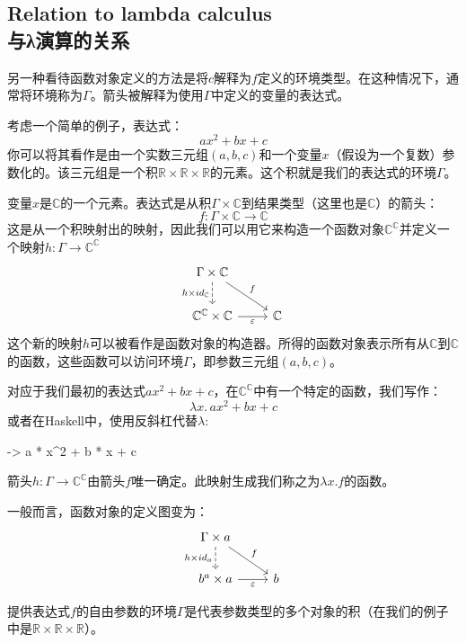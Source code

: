 \documentclass[DaoFP]{subfiles}
\begin{document}
\subsection{Relation to lambda calculus\\与λ演算的关系}

另一种看待函数对象定义的方法是将$c$解释为$f$定义的环境类型。在这种情况下，通常将环境称为$\Gamma$。箭头被解释为使用$\Gamma$中定义的变量的表达式。

考虑一个简单的例子，表达式：
\[a x^2 + b x + c\]
你可以将其看作是由一个实数三元组$(a, b, c)$和一个变量$x$（假设为一个复数）参数化的。该三元组是一个积$\mathbb{R} \times \mathbb{R} \times \mathbb{R}$的元素。这个积就是我们的表达式的环境$\Gamma$。

变量$x$是$\mathbb{C}$的一个元素。表达式是从积$\Gamma \times \mathbb{C}$到结果类型（这里也是$\mathbb{C}$）的箭头：
\[f \colon \Gamma \times \mathbb{C} \to \mathbb{C} \]
这是从一个积映射出的映射，因此我们可以用它来构造一个函数对象$\mathbb{C}^{\mathbb{C}}$并定义一个映射$h \colon \Gamma \to \mathbb{C}^{\mathbb{C}}$
\[
\begin{tikzcd}
\Gamma \times \mathbb{C}
\arrow[d, dashed, "h \times id_{\mathbb{C}}"']
\arrow[rd, "f"]
\\
\mathbb{C}^{\mathbb{C}} \times \mathbb{C}
\arrow[r, "\varepsilon"']
& \mathbb{C}
\end{tikzcd}
\]
这个新的映射$h$可以被看作是函数对象的构造器。所得的函数对象表示所有从$\mathbb{C}$到$\mathbb{C}$的函数，这些函数可以访问环境$\Gamma$，即参数三元组$(a, b, c)$。

对应于我们最初的表达式$a x^2 + b x + c$，在$\mathbb{C}^{\mathbb{C}}$中有一个特定的函数，我们写作：
\[  \lambda x . \,a x^2 + b x + c \]
或者在Haskell中，使用反斜杠代替$\lambda$:
\begin{haskell}
\x -> a * x^2 + b * x + c
\end{haskell}

箭头$h \colon \Gamma \to \mathbb{C}^{\mathbb{C}}$由箭头$f$唯一确定。此映射生成我们称之为$\lambda x . f$的函数。

一般而言，函数对象的定义图变为：
\[
\begin{tikzcd}
\Gamma \times a
\arrow[d, dashed, "{h \times id_a}"']
\arrow[rd, "f"]
\\
b^a \times a
\arrow[r, "\varepsilon"']
& b
\end{tikzcd}
\]

提供表达式$f$的自由参数的环境$\Gamma$是代表参数类型的多个对象的积（在我们的例子中是$\mathbb{R} \times \mathbb{R} \times \mathbb{R}$）。
\end{document}

